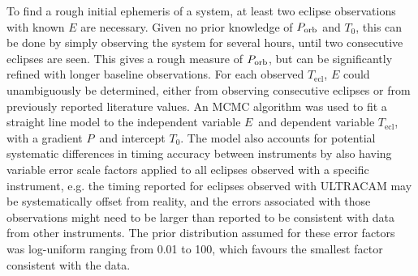 To find a rough initial ephemeris of a system, at least two eclipse observations with known $E$ are necessary. Given no prior knowledge of $P_{\rm orb}$ and $T_0$, this can be done by simply observing the system for several hours, until two consecutive eclipses are seen. This gives a rough measure of $P_{\rm orb}$, but can be significantly refined with longer baseline observations.
For each observed $T_\mathrm{ecl}$, $E$ could unambiguously be determined, either from observing consecutive eclipses or from previously reported literature values.
An MCMC algorithm was used to fit a straight line model to the independent variable $E$\ and dependent variable $T_\mathrm{ecl}$, with a gradient $P$\ and intercept $T_0$.
The model also accounts for potential systematic differences in timing accuracy between instruments by also having variable error scale factors applied to all eclipses observed with a specific instrument, e.g. the timing reported for eclipses observed with ULTRACAM may be systematically offset from reality, and the errors associated with those observations might need to be larger than reported to be consistent with data from other instruments. The prior distribution assumed for these error factors was log-uniform ranging from 0.01 to 100, which favours the smallest factor consistent with the data.

